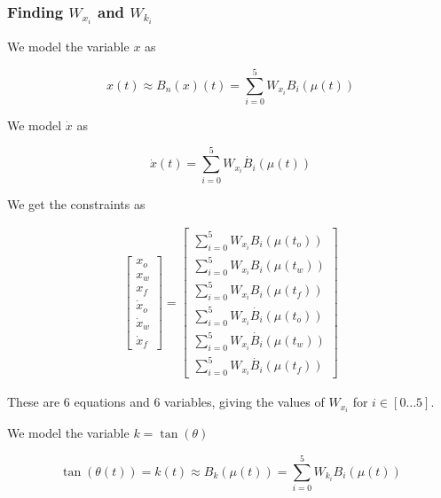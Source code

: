 \subsubsection{Finding \texorpdfstring{$W_{x_i}$}{weights for x} and \texorpdfstring{$W_{k_i}$}{weights for k}}

We model the variable $x$ as

\begin{equation}
    x(t) \approx B_n(x)(t) = \sum_{i = 0}^{5} W_{x_i} B_i (\mu(t))
    \label{eq:x-bernstein-model}
\end{equation}

We model $\dot{x}$ as

\begin{equation}
    \dot{x}(t) = \sum_{i = 0}^{5} W_{x_i} \dot{B_i} (\mu(t))
    \label{eq:xdot-bernstein-model}
\end{equation}

We get the constraints as

\begin{align}
    \begin{bmatrix}
        x_o \\ x_w \\ x_f \\ 
        \dot{x}_o \\ \dot{x}_w \\ \dot{x}_f
    \end{bmatrix} = \begin{bmatrix}
        \sum_{i = 0}^{5} W_{x_i} B_i (\mu(t_o)) \\
        \sum_{i = 0}^{5} W_{x_i} B_i (\mu(t_w)) \\
        \sum_{i = 0}^{5} W_{x_i} B_i (\mu(t_f)) \\
        \sum_{i = 0}^{5} W_{x_i} \dot{B_i} (\mu(t_o)) \\
        \sum_{i = 0}^{5} W_{x_i} \dot{B_i} (\mu(t_w)) \\
        \sum_{i = 0}^{5} W_{x_i} \dot{B_i} (\mu(t_f))
    \end{bmatrix}
    \label{eq:wx-mat-equs-full}
\end{align}

These are 6 equations and 6 variables, giving the values of $W_{x_i}$ for $i \in [0\dots 5]$.

We model the variable $k = \tan(\theta)$

\begin{equation}
    \tan \left( \theta(t) \right) = k(t) \approx B_k(\mu(t)) = \sum_{i = 0}^{5} W_{k_i} B_i (\mu(t))
    \label{eq:tan-bernstein-model}
\end{equation}

